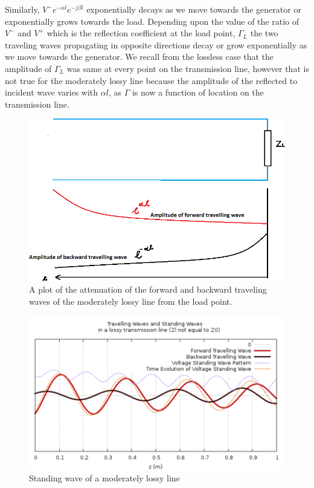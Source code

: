 Similarly, $V^-e^{-\alpha l}e^{-j\beta l}$ exponentially decays as we move towards the generator or exponentially grows towards the load. Depending upon the value of the ratio of $V^-$ and $V^+$ which is the reflection coefficient at the load point, $\Gamma_L$ the two traveling waves propagating in opposite directions decay or grow exponentially as we move towards the generator. We recall from the lossless case that the amplitude of $\Gamma_L$ was same at every point on the transmission line, however that is not true for the moderately lossy line because the amplitude of the reflected to incident wave varies with $\alpha l$, as $\Gamma$ is now a function of location on the transmission line.
\begin{figure}[h]
\centering
\includegraphics[width=0.7\linewidth]{"./graphics/Standing wave"}
\caption{A plot of the attenuation of the forward and backward traveling waves of the moderately lossy line from the load point.}
\end{figure}
\begin{figure}[h]
\centering
\includegraphics[width=1\linewidth]{./graphics/plot}
\caption{Standing wave of a moderately lossy line}
\end{figure}

